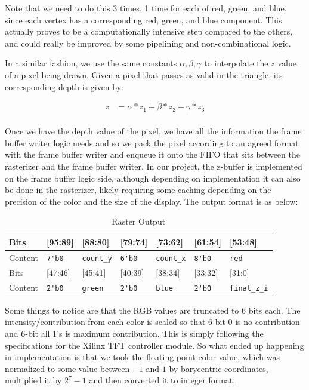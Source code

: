 \documentclass[letterpaper,10pt]{article}
\begin{document}
Note that we need to do this 3 times, 1 time for each of red, green, and blue, since each vertex has a corresponding red, green, and blue component. This actually proves to be a computationally intensive step compared to the others, and could really be improved by some pipelining and non-combinational logic. 

In a similar fashion, we use the same constants $\alpha, \beta, \gamma$ to interpolate the $z$ value of a pixel being drawn. Given a pixel that passes as valid in the triangle, its corresponding depth is given by:

\begin{align*}
    z &= \alpha*z_{1} + \beta*z_{2} + \gamma*z_{3}					\\
\end{align*}

Once we have the depth value of the pixel, we have all the information the frame buffer writer logic needs and so we pack the pixel according to an agreed format with the frame buffer writer and enqueue it onto the FIFO that sits between the rasterizer and the frame buffer writer. In our project, the z-buffer is implemented on the frame buffer logic side, although depending on implementation it can also be done in the rasterizer, likely requiring some caching depending on the precision of the color and the size of the display. The output format is as below:

\begin{table}[h]
\begin{center}
\begin{tabular}{ | l | l | l | l | l | l | l |}
\hline
Bits & [95:89] & [88:80] & [79:74] & [73:62] & [61:54] & [53:48] \\ \hline
Content & \verb!7'b0! & \verb!count_y! & \verb!6'b0! & \verb!count_x! & \verb!8'b0! & \verb!red!  \\ \hline
Bits & [47:46] & [45:41] & [40:39] & [38:34] & [33:32] & [31:0] \\ \hline
Content & \verb!2'b0! & \verb!green! & \verb!2'b0! & \verb!blue! & \verb!2'b0! & \verb!final_z_i! \\ \hline
\end{tabular}
\end{center}
\caption{Raster Output}
\end{table}

Some things to notice are that the RGB values are truncated to 6 bits each. The intensity/contribution from each color is scaled so that 6-bit 0 is no contribution and 6-bit all 1's is maximum contribution. This is simply following the specifications for the Xilinx TFT controller module. So what ended up happening in implementation is that we took the floating point color value, which was normalized to some value between $-1$ and $1$ by barycentric coordinates, multiplied it by $2^{7}-1$ and then converted it to integer format. 
\end{document}
